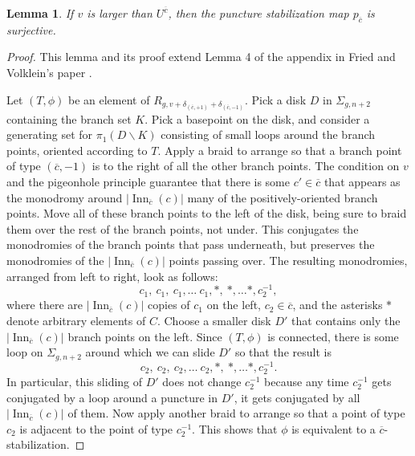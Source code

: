 \documentclass[10pt,twocolumn,amsmath,amssymb,aps,pra,secnumarabic,
    nofootinbib,groupedaddress]{revtex4-1}
\newtheorem{lemma}[theorem]{Lemma}
\renewcommand{\setminus}{\smallsetminus}
\newcommand{\Inn}{\operatorname{Inn}}
\begin{document}
\begin{lemma}
If $v$ is larger than $U^{\overline{c}}$, then the puncture stabilization map $p_{\overline{c}}$ is surjective.
\label{l:puncture}
\end{lemma}

\begin{proof}
This lemma and its proof extend Lemma 4 of the appendix in Fried and Volklein's paper \cite{FriedVolklein:galois}.  

Let $(T,\phi)$ be an element of $R_{g,v + \delta_{(\overline{c},+1)} + \delta_{(\overline{c},-1)}}$.  Pick a disk $D$ in $\Sigma_{g,n+2}$ containing the branch set $K$.  Pick a basepoint on the disk, and consider a generating set for $\pi_1(D\setminus K)$ consisting of small loops around the branch points, oriented according to $T$.  Apply a braid to arrange so that a branch point of type $(\overline{c},-1)$ is to the right of all the other branch points.  The condition on $v$ and the pigeonhole principle guarantee that there is some $c' \in \overline{c}$ that appears as the monodromy around $|\Inn_{\overline{c}}(c)|$ many of the positively-oriented branch points.  Move all of these branch points to the left of the disk, being sure to braid them over the rest of the branch points, not under.  This conjugates the monodromies of the branch points that pass underneath, but preserves the monodromies of the $|\Inn_{\overline{c}}(c)|$ points passing over.  The resulting monodromies, arranged from left to right, look as follows:
\[ c_1, \ c_1, \ c_1, \dots \ c_1, *, \ *, \dots *, c_2^{-1},\]
where there are $|\Inn_{\overline{c}}(c)|$ copies of $c_1$ on the left, $c_2 \in \overline{c}$, and the asterisks $*$ denote arbitrary elements of $C$.  Choose a smaller disk $D'$ that contains only the $|\Inn_{\overline{c}}(c)|$ branch points on the left.  Since $(T,\phi)$ is connected, there is some loop on $\Sigma_{g,n+2}$ around which we can slide $D'$ so that the result is
\[ c_2, \ c_2, \ c_2, \dots \ c_2, *, \ *, \dots *, c_2^{-1}.\]
In particular, this sliding of $D'$ does not change $c_2^{-1}$ because any time $c_2^{-1}$ gets conjugated by a loop around a puncture in $D'$, it gets conjugated by all $|\Inn_{\overline{c}}(c)|$ of them.  Now apply another braid to arrange so that a point of type $c_2$ is adjacent to the point of type $c_2^{-1}$.  This shows that $\phi$ is equivalent to a $\overline{c}$-stabilization.
\end{proof}
\end{document}

